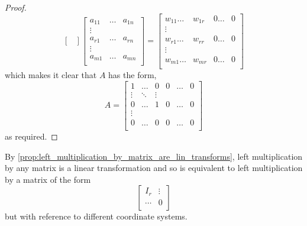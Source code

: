 \documentclass[../MathsNotesBase.tex]{subfiles}
\begin{document}
{\begin{proof}
\[\begin{bmatrix}
				\end{bmatrix}
				\begin{bmatrix}
				a_{11} & \dots & a_{1n} \\
				\vdots &  &  \\
				a_{r1} & \dots & a_{rn} \\
				\vdots &  &  \\
				a_{m1} & \dots & a_{mn} \\
				\end{bmatrix}
				= 
				\begin{bmatrix}
				w_{11} \dots & w_{1r} & 0 \dots & 0 \\
				\vdots &  &  &  \\
				w_{r1} \dots & w_{rr} & 0 \dots & 0 \\
				\vdots &  &  &  \\
				w_{m1} \dots & w_{mr} & 0 \dots & 0 \\
				\end{bmatrix}
			\]
			which makes it clear that $A$ has the form,
			\[ A =
				\begin{bmatrix}
				1 & \dots & 0 & 0 & \dots & 0 \\
				\vdots & \ddots & \vdots & &  \\
				0 & \dots & 1 & 0 & \dots & 0 \\
				\vdots &  & & &  \\
				0 & \dots & 0 & 0 & \dots & 0 \\
				\end{bmatrix}
			\]
			as required.
		\end{proof}
		\begin{corollary}
			By \autoref{prop:left_multiplication_by_matrix_are_lin_transforms}, left multiplication by any matrix is a linear transformation and so is equivalent to left multiplication by a matrix of the form
			\[
			\begin{bmatrix}
				I_r & \vdots \\
				\cdots & 0 \\
				\end{bmatrix}
			\]
			but with reference to different coordinate systems.
		\end{corollary}
	
		\bigskip
}
\end{document}
